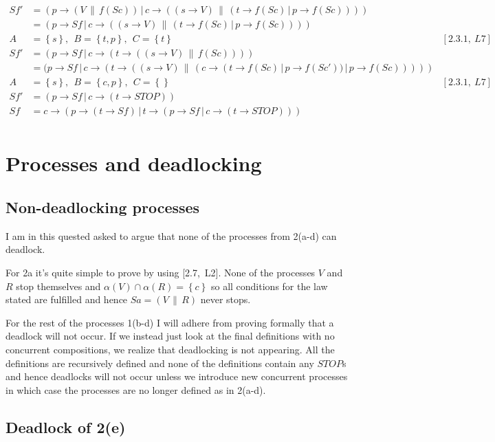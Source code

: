 \documentclass[11pt,a4paper]{article}
\def\ra{\rightarrow}
\def\cc{\,\|\,}
\def\ch{\,|\,}
\newcommand{\sN}[1]{\left \lbrace #1 \right \rbrace}
\begin{document}
\begin{align*}
    Sf'   &= (p \ra (V \cc f(Sc))  \ch c \ra ((s \ra V) \cc
             (t \ra f(Sc) \ch p \ra f(Sc)))) & \\
          &= (p \ra Sf  \ch c \ra ((s \ra V) \cc
             (t \ra f(Sc) \ch p \ra f(Sc)))) & \\
        A &= \sN{s},~~ B = \sN{t,p},~~ C = \sN{t} & [2.3.1,~L7] \\
    Sf'   &= (p \ra Sf  \ch
              c \ra (t \ra ((s \ra V) \cc f(Sc)))) & \\
          &= (p \ra Sf  \ch
              c \ra (t \ra ((s \ra V) \cc
                            (c \ra (t \ra f(Sc) \ch p \ra f(Sc')) \ch p \ra f(Sc))))) & \\
        A &= \sN{s},~~ B = \sN{c,p},~~ C = \sN{ } & [2.3.1,~L7] \\
    Sf'   &= (p \ra Sf \ch c \ra (t \ra STOP)) & \\
    Sf &= c \ra (p \ra (t \ra Sf)
            \ch t \ra  (p \ra Sf \ch c \ra (t \ra STOP))) & \\
\end{align*}

\section{Processes and deadlocking}

\subsection{Non-deadlocking processes}
I am in this quested asked to argue that none of the processes from 2(a-d) can
deadlock.

For 2a it's quite simple to prove by using [2.7,~L2]. None of the
processes $V$ and $R$ stop themselves and $\alpha(V) \cap \alpha(R) = \sN{c}$ so
all conditions for the law stated are fulfilled and hence $Sa = (V \cc R)$ never
stops.

For the rest of the processes 1(b-d) I will adhere from proving formally that a
deadlock will not occur. If we instead just look at the final definitions with
no concurrent compositions, we realize that deadlocking is not appearing. All
the definitions are recursively defined and none of the definitions contain any
$STOP$s and hence deadlocks will not occur unless we introduce new concurrent
processes in which case the processes are no longer defined as in 2(a-d).

\subsection{Deadlock of 2(e)}
\end{document}
